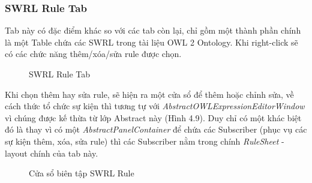\subsubsection{SWRL Rule Tab}
Tab này có đặc điểm khác so với các tab còn lại, chỉ gồm một thành phần chính là một Table chứa các SWRL trong tài liệu OWL 2 Ontology. Khi right-click sẽ có các chức năng thêm/xóa/sửa rule được chọn.
\begin{figure}[h!]
	\centering
	\caption{SWRL Rule Tab\label{overflow}}
\end{figure}
Khi chọn thêm hay sửa rule, sẽ hiện ra một cửa sổ để thêm hoặc chỉnh sửa, về cách thức tổ chức sự kiện thì tương tự với \textit{AbstractOWLExpressionEditorWindow} vì chúng được kế thừa từ lớp Abstract này (Hình 4.9). Duy chỉ có một khác biệt đó là thay vì có một \textit{AbstractPanelContainer} để chứa các Subscriber (phục vụ các sự kiện thêm, xóa, sửa rule) thì các Subscriber nằm trong chính \textit{RuleSheet} - layout chính của tab này.
\begin{figure}[h!]
	\centering
	\caption{Cửa sổ biên tập SWRL Rule\label{overflow}}
\end{figure}
